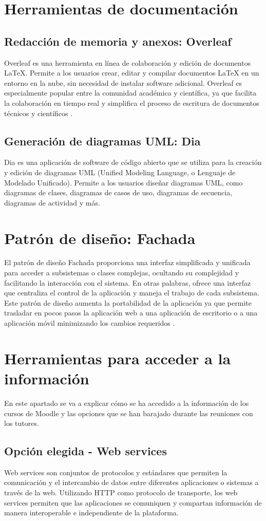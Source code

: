 \section{Herramientas de documentación}
\subsection{Redacción de memoria y anexos: Overleaf}
Overleaf es una herramienta en línea de colaboración y edición de documentos LaTeX. Permite a los usuarios crear, editar y compilar documentos LaTeX en un entorno en la nube, sin necesidad de instalar software adicional. Overleaf es especialmente popular entre la comunidad académica y científica, ya que facilita la colaboración en tiempo real y simplifica el proceso de escritura de documentos técnicos y científicos \cite{overleaf}.
\subsection{Generación de diagramas UML: Dia}
Dia es una aplicación de software de código abierto que se utiliza para la creación y edición de diagramas UML (Unified Modeling Language, o Lenguaje de Modelado Unificado). Permite a los usuarios diseñar diagramas UML, como diagramas de clases, diagramas de casos de uso, diagramas de secuencia, diagramas de actividad y más.

\section{Patrón de diseño: Fachada}
El patrón de diseño Fachada proporciona una interfaz simplificada y unificada para acceder a subsistemas o clases complejas, ocultando su complejidad y facilitando la interacción con el sistema. En otras palabras, ofrece una interfaz que centraliza el control de la aplicación y maneja el trabajo de cada subsistema.
Este patrón de diseño aumenta la portabilidad de la aplicación ya que permite trasladar en pocos pasos la aplicación web a una aplicación de escritorio o a una aplicación móvil minimizando los cambios requeridos \cite{mendia2019}.

 \section{Herramientas para acceder a la información}
En este apartado se va a explicar cómo se ha accedido a la información de los cursos de Moodle y las opciones que se han barajado durante las reuniones con los tutores.
\subsection{Opción elegida - Web services}
Web services son conjuntos de protocolos y estándares que permiten la comunicación y el intercambio de datos entre diferentes aplicaciones o sistemas a través de la web. Utilizando HTTP como protocolo de transporte, los web services permiten que las aplicaciones se comuniquen y compartan información de manera interoperable e independiente de la plataforma.


